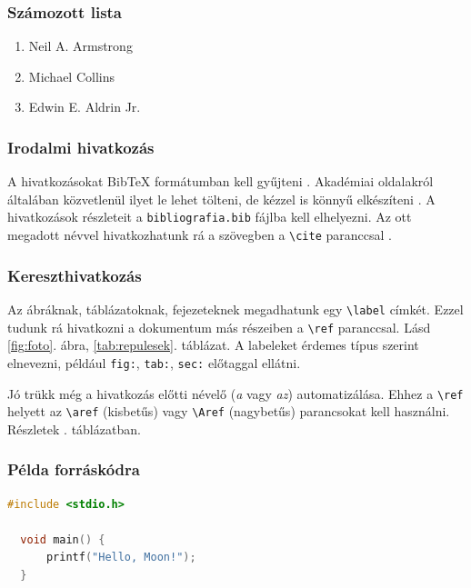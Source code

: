 \documentclass[12pt]{article}
\begin{document}
\subsubsection*{Számozott lista}
\begin{enumerate}
  \item Neil A. Armstrong
  \item Michael Collins
  \item Edwin E. Aldrin Jr.
\end{enumerate} 

\subsubsection*{Irodalmi hivatkozás}
A hivatkozásokat BibTeX formátumban kell gyűjteni \cite{Lee1987}. Akadémiai oldalakról általában közvetlenül ilyet le lehet tölteni, de kézzel is könnyű elkészíteni \cite{Nasa}. A hivatkozások részleteit a \verb|bibliografia.bib| fájlba kell elhelyezni. Az ott megadott névvel hivatkozhatunk rá a szövegben a \verb|\cite| paranccsal \cite{Jeney2014}.

\subsubsection*{Kereszthivatkozás}
Az ábráknak, táblázatoknak, fejezeteknek megadhatunk egy \verb|\label| címkét. Ezzel tudunk rá hivatkozni a dokumentum más részeiben a \verb|\ref| paranccsal. Lásd \ref{fig:foto}. ábra, \ref{tab:repulesek}. táblázat. A labeleket érdemes típus szerint elnevezni, például \verb|fig:|, \verb|tab:|, \verb|sec:| előtaggal ellátni. 

Jó trükk még a hivatkozás előtti névelő (\emph{a} vagy \emph{az}) automatizálása. Ehhez a \verb|\ref| helyett az \verb|\aref| (kisbetűs) vagy \verb|\Aref| (nagybetűs) parancsokat kell használni. Részletek . táblázatban.


\subsubsection*{Példa forráskódra}
\begin{lstlisting}[language=C]
  #include <stdio.h>

  void main() {
      printf("Hello, Moon!");
  }
\end{lstlisting}

{\footnotesize }
\end{document}
